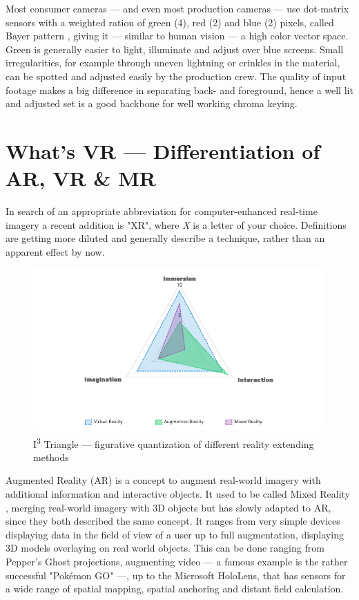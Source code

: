 Most consumer cameras --- and even most production cameras --- use dot-matrix 
sensors with a weighted ration of green (4), red (2) and blue (2) pixels, 
called Bayer pattern \cite{kodak:bayer:1976}, giving it --- similar to human 
vision --- a high color vector space. Green is generally easier to light, 
illuminate and adjust over blue screens. Small irregularities, for example 
through uneven lightning or crinkles in the material, can be spotted and 
adjusted easily by the production crew.
\newline
The quality of input footage makes a big difference in separating back- and 
foreground, hence a well lit and adjusted set is a good backbone for well 
working chroma keying.

\section{What's VR --- Differentiation of AR, VR \& MR}

In search of an appropriate abbreviation for computer-enhanced real-time 
imagery a recent addition is "XR", where \textit{X} is a letter of your choice. 
Definitions are getting more diluted and generally describe a technique, rather 
than an apparent effect by now.

\begin{figure}[htb]
	\includegraphics[width=\textwidth]{gfx/ext-reality/i3-triangle.png}
	\caption{I\textsuperscript{3} Triangle --- figurative quantization of 
		different reality extending methods}
	\label{fig:xr:i3-triangle}
\end{figure}
Augmented Reality (AR) is a concept to augment real-world imagery with 
additional information and interactive objects. It used to be called Mixed 
Reality\cite{satoh:case:1998} \cite{tamura:mixed-reality:2001}, merging 
real-world imagery with 3D objects but has slowly adapted to AR, since they 
both described the same concept. It ranges from very simple devices displaying 
data in the field of view of a user up to full augmentation, displaying 3D 
models overlaying on real world objects. This can be done ranging from Pepper's 
Ghost projections, augmenting video --- a famous example is the rather 
successful "Pokémon GO" ---, up to the Microsoft HoloLens, that has sensors for 
a wide range of spatial mapping, spatial anchoring and distant field 
calculation.

